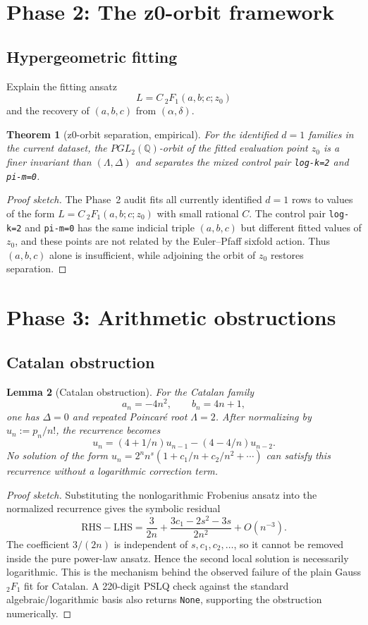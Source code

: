 \documentclass[11pt]{article}
\newtheorem{theorem}{Theorem}[section]
\newtheorem{lemma}[theorem]{Lemma}
\begin{document}
\section{Phase 2: The z0-orbit framework}
\subsection{Hypergeometric fitting}
Explain the fitting ansatz
\[
L = C\,{}_2F_1(a,b;c;z_0)
\]
and the recovery of $(a,b,c)$ from $(\alpha,\delta)$.

\begin{theorem}[z0-orbit separation, empirical]\label{thm:z0-orbit-outline}
For the identified $d=1$ families in the current dataset, the $PGL_2(\mathbb{Q})$-orbit of the fitted evaluation point $z_0$ is a finer invariant than $(\Lambda,\Delta)$ and separates the mixed control pair \texttt{log-k=2} and \texttt{pi-m=0}.
\end{theorem}

\begin{proof}[Proof sketch]
The Phase~2 audit fits all currently identified $d=1$ rows to values of the form $L=C\,{}_2F_1(a,b;c;z_0)$ with small rational $C$. The control pair \texttt{log-k=2} and \texttt{pi-m=0} has the same indicial triple $(a,b,c)$ but different fitted values of $z_0$, and these points are not related by the Euler--Pfaff sixfold action. Thus $(a,b,c)$ alone is insufficient, while adjoining the orbit of $z_0$ restores separation.
\end{proof}

\section{Phase 3: Arithmetic obstructions}
\subsection{Catalan obstruction}
\begin{lemma}[Catalan obstruction]\label{lem:catalan-outline}
For the Catalan family
\[
  a_n=-4n^2,\qquad b_n=4n+1,
\]
one has $\Delta=0$ and repeated Poincar\'e root $\Lambda=2$. After normalizing by $u_n:=p_n/n!$, the recurrence becomes
\[
  u_n=(4+1/n)u_{n-1}-(4-4/n)u_{n-2}.
\]
No solution of the form $u_n=2^n n^s(1+c_1/n+c_2/n^2+\cdots)$ can satisfy this recurrence without a logarithmic correction term.
\end{lemma}

\begin{proof}[Proof sketch]
Substituting the nonlogarithmic Frobenius ansatz into the normalized recurrence gives the symbolic residual
\[
  \mathrm{RHS}-\mathrm{LHS}=\frac{3}{2n}+\frac{3c_1-2s^2-3s}{2n^2}+O(n^{-3}).
\]
The coefficient $3/(2n)$ is independent of $s,c_1,c_2,\dots$, so it cannot be removed inside the pure power-law ansatz. Hence the second local solution is necessarily logarithmic. This is the mechanism behind the observed failure of the plain Gauss ${}_2F_1$ fit for Catalan. A 220-digit PSLQ check against the standard algebraic/logarithmic basis also returns \texttt{None}, supporting the obstruction numerically.
\end{proof}
\end{document}
